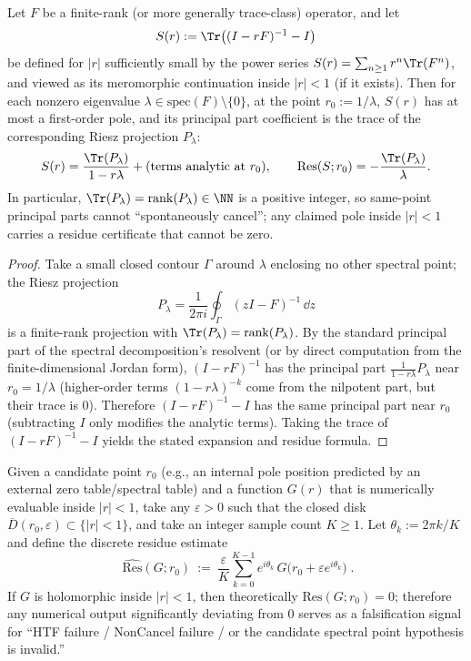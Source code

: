 \begin{proposition}[Integer residue certificate for the resolvent-trace: positive multiplicity \texorpdfstring{$\Rightarrow$}{=>} NonCancel]\label{prop:resolvent-trace-integer-residue-noncancel}
Let \(F\) be a finite-rank (or more generally trace-class) operator, and let
\[
S(r):=\Tr\bigl((I-rF)^{-1}-I\bigr)
\]
be defined for \(|r|\) sufficiently small by the power series \(S(r)=\sum_{n\ge 1}r^n\Tr(F^n)\), and viewed as its meromorphic continuation inside \(|r|<1\) (if it exists).
Then for each nonzero eigenvalue \(\lambda\in\mathrm{spec}(F)\setminus\{0\}\), at the point \(r_0:=1/\lambda\), \(S(r)\) has at most a first-order pole, and its principal part coefficient is the trace of the corresponding Riesz projection \(P_\lambda\):
\[
S(r)=\frac{\Tr(P_\lambda)}{1-r\lambda}+(\text{terms analytic at }r_0),
\qquad
\mathrm{Res}(S;r_0)=-\frac{\Tr(P_\lambda)}{\lambda}.
\]
In particular, \(\Tr(P_\lambda)=\mathrm{rank}(P_\lambda)\in\NN\) is a positive integer, so same-point principal parts cannot ``spontaneously cancel''; any claimed pole inside \(|r|<1\) carries a residue certificate that cannot be zero.
\end{proposition}
\begin{proof}
Take a small closed contour \(\Gamma\) around \(\lambda\) enclosing no other spectral point; the Riesz projection
\[
P_\lambda=\frac{1}{2\pi i}\oint_\Gamma (zI-F)^{-1}\,\dd z
\]
is a finite-rank projection with \(\Tr(P_\lambda)=\mathrm{rank}(P_\lambda)\).
By the standard principal part of the spectral decomposition's resolvent (or by direct computation from the finite-dimensional Jordan form),
\((I-rF)^{-1}\) has the principal part
\(
\frac{1}{1-r\lambda}P_\lambda
\)
near \(r_0=1/\lambda\)
(higher-order terms \((1-r\lambda)^{-k}\) come from the nilpotent part, but their trace is \(0\)).
Therefore \((I-rF)^{-1}-I\) has the same principal part near \(r_0\) (subtracting \(I\) only modifies the analytic terms).
Taking the trace of \((I-rF)^{-1}-I\) yields the stated expansion and residue formula.
\end{proof}

\begin{algorithm}\label{alg:residue-ring-test}
Given a candidate point \(r_0\) (e.g., an internal pole position predicted by an external zero table/spectral table) and a function \(G(r)\) that is numerically evaluable inside \(|r|<1\), take any \(\varepsilon>0\) such that the closed disk \(\overline{D}(r_0,\varepsilon)\subset\{|r|<1\}\), and take an integer sample count \(K\ge 1\).
Let \(\theta_k:=2\pi k/K\) and define the discrete residue estimate
\[
\boxed{\;
\widehat{\mathrm{Res}}(G;r_0)
\ :=\ \frac{\varepsilon}{K}\sum_{k=0}^{K-1} e^{i\theta_k}\,G\!\bigl(r_0+\varepsilon e^{i\theta_k}\bigr)\; }.
\]
If \(G\) is holomorphic inside \(|r|<1\), then theoretically \(\mathrm{Res}(G;r_0)=0\); therefore any numerical output significantly deviating from \(0\) serves as a falsification signal for ``HTF failure / NonCancel failure / or the candidate spectral point hypothesis is invalid.''
\end{algorithm}


